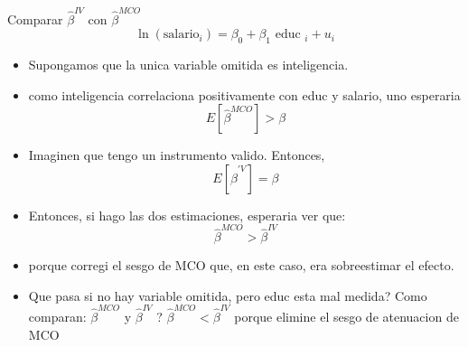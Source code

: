 \documentclass[10pt]{beamer}
\begin{document}
\begin{frame}{Comparar $\hat{\beta}^{IV}$ con $\hat{\beta}^{MCO}$}  
    $$
    \ln \left(\text {salario}_{i}\right)=\beta_{0}+\beta_{1} \text { educ }_{i}+u_{i}
    $$
    \begin{itemize}
        \item Supongamos que la unica variable omitida es inteligencia.
        \item como inteligencia correlaciona positivamente con educ y salario, uno esperaria
        $$
        E\left[\hat{\beta}^{M C O}\right]>\beta
        $$
        \item Imaginen que tengo un instrumento valido. Entonces,
        $$
        E\left[\hat{\beta}^{\prime V}\right]=\beta
        $$
        \item Entonces, si hago las dos estimaciones, esperaria ver que:
        $$
        \hat{\beta}^{M C O}>\hat{\beta}^{I V}
        $$
        \item porque corregi el sesgo de MCO que, en este caso, era sobreestimar el efecto.
        \item Que pasa si no hay variable omitida, pero educ esta mal medida? Como comparan: $\hat{\beta}^{M C O}$ y $\hat{\beta}^{I V}$ ? $\hat{\beta}^{M C O}<\hat{\beta}^{I V}$ porque elimine el sesgo de atenuacion de MCO
    \end{itemize}
\end{frame}
\end{document}

